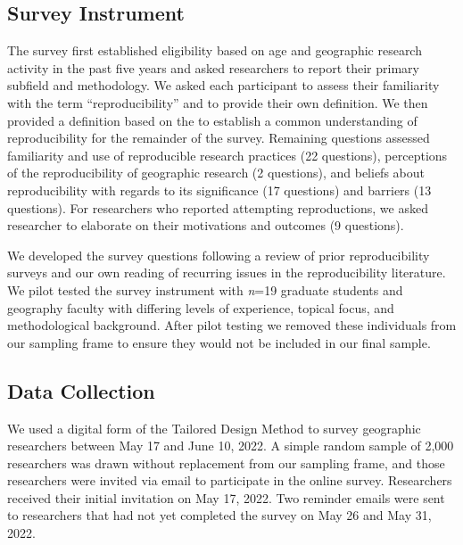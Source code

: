 \documentclass[]{interact}
\theoremstyle{plain}%
\theoremstyle{definition}
\theoremstyle{remark}
\begin{document}
\subsection*{Survey Instrument}
The survey first established eligibility based on age and geographic research activity in the past five years and asked researchers to report their primary subfield and methodology.
We asked each participant to assess their familiarity with the term ``reproducibility'' and to provide their own definition. 
We then provided a definition based on the \citet{NASEM2019} to establish a common understanding of reproducibility for the remainder of the survey.
Remaining questions assessed familiarity and use of reproducible research practices (22 questions), perceptions of the reproducibility of geographic research (2 questions), and beliefs about reproducibility with regards to its significance (17 questions) and barriers (13 questions).
For researchers who reported attempting reproductions, we asked researcher to elaborate on their motivations and outcomes (9 questions).

We developed the survey questions following a review of prior reproducibility surveys \citep[e.g.,][]{fanelli2009many,baker20161, konkol2019} and our own reading of recurring issues in the reproducibility literature. 
We pilot tested the survey instrument with \textit{n}=19 graduate students and geography faculty with differing levels of experience, topical focus, and methodological background. 
After pilot testing we removed these individuals from our sampling frame to ensure they would not be included in our final sample.

\subsection*{Data Collection}
We used a digital form of the Tailored Design Method \citep{dillman2014internet} to survey geographic researchers between May 17 and June 10, 2022.
A simple random sample of 2,000 researchers was drawn without replacement from our sampling frame, and those researchers were invited via email to participate in the online survey. 
Researchers received their initial invitation on May 17, 2022. 
Two reminder emails were sent to researchers that had not yet completed the survey on May 26 and May 31, 2022.
\end{document}
